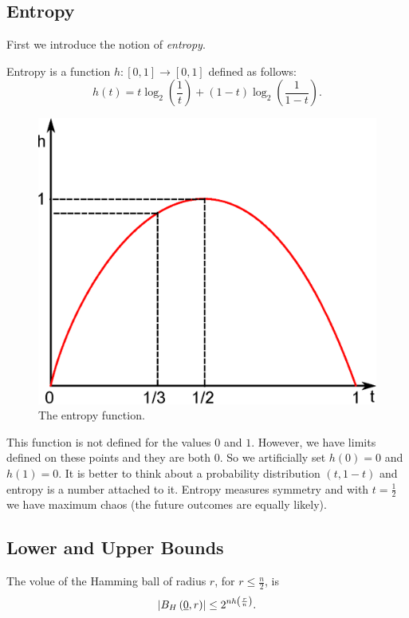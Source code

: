 \subsection{Entropy}
First we introduce the notion of \emph{entropy}.

\begin{definition}[Entropy]
Entropy is a function $h: [0, 1] \rightarrow [0, 1]$ defined as follows:
\begin{equation}
	h(t) = t\log_2\left(\frac{1}{t}\right) + (1 - t)\log_2\left(\frac{1}{1-t}\right).
\end{equation} 
\end{definition}

\begin{figure}[h!]
	\centering
	\includegraphics[width=0.5\linewidth]{pictures/ch01-i00.eps}
	\caption{The entropy function.}
\end{figure}

This function is not defined for the values $0$ and $1$.
However, we have limits defined on these points and they are both $0$.
So we artificially set $h(0) = 0$ and $h(1) = 0$.
It is better to think about a probability distribution $(t, 1 - t)$ and entropy is a number attached to it.
Entropy measures symmetry and with $t = \frac{1}{2}$ we have maximum chaos (the future outcomes are equally likely).

\subsection{Lower and Upper Bounds}

\begin{thm}
	The volue of the Hamming ball of radius $r$, for $r \leq \frac{n}{2}$, is
	\begin{equation*}
		\left|{B_H\left(\underline{0}, r\right)}\right| \leq 2^{nh\left(\frac{r}{n}\right)}.
	\end{equation*}
\end{thm}

